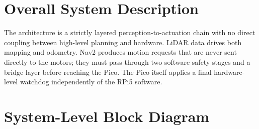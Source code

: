 \documentclass[12pt,a4paper]{report}
\begin{document}
\section{Overall System Description}

The architecture is a strictly layered perception-to-actuation chain with no direct coupling between high-level planning and hardware. LiDAR data drives both mapping and odometry. Nav2 produces motion requests that are never sent directly to the motors; they must pass through two software safety stages and a bridge layer before reaching the Pico. The Pico itself applies a final hardware-level watchdog independently of the RPi5 software.

\section{System-Level Block Diagram}
\end{document}
